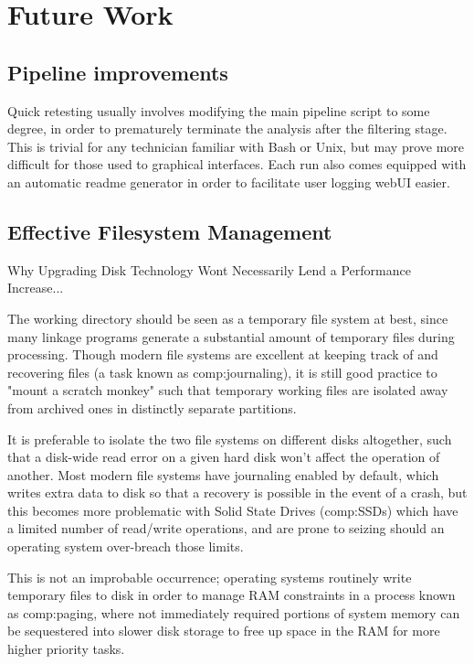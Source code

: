 \section{Future Work}


\subsection{Pipeline improvements}
Quick retesting usually involves modifying the main pipeline script to some degree, in order to prematurely terminate the analysis after the filtering stage. This is trivial for any technician familiar with Bash or Unix, but may prove more difficult for those used to graphical interfaces. Each run also comes equipped with an automatic readme generator in order to facilitate user logging webUI easier.


\subsection{Effective Filesystem Management}

Why Upgrading Disk Technology Wont Necessarily Lend a Performance Increase...

The working directory should be seen as a temporary file system at best, since many linkage programs generate a substantial amount of temporary files during processing. Though modern file systems are excellent at keeping track of and recovering files (a task known as \gls{comp:journaling}), it is still good practice to "mount a scratch monkey" such that temporary working files are isolated away from archived ones in distinctly separate partitions. 

It is preferable to isolate the two file systems on different disks altogether, such that a disk-wide read error on a given hard disk won't affect the operation of another. Most modern file systems have journaling enabled by default, which writes extra data to disk so that a recovery is possible in the event of a crash, but this becomes more problematic with Solid State Drives (\gls{comp:SSD}s) which have a limited number of read/write operations, and are prone to seizing should an operating system over-breach those limits.

This is not an improbable occurrence; operating systems routinely write temporary files to disk in order to manage RAM constraints in a process known as \gls{comp:paging}, where not immediately required portions of system memory can be sequestered into slower disk storage to free up space in the RAM for more higher priority tasks. 

